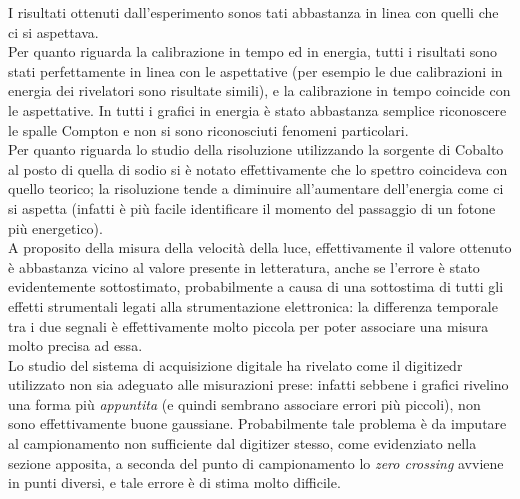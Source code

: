 I risultati ottenuti dall'esperimento sonos tati abbastanza in linea con quelli che ci si aspettava.\\

Per quanto riguarda la calibrazione in tempo ed in energia, tutti i risultati sono stati perfettamente in linea con le aspettative (per esempio le due calibrazioni in energia
dei rivelatori sono risultate simili), e la calibrazione in tempo coincide con le aspettative. In tutti i grafici in energia è stato abbastanza semplice riconoscere le spalle
Compton e non si sono riconosciuti fenomeni particolari.\\

Per quanto riguarda lo studio della risoluzione utilizzando la sorgente di Cobalto al posto di quella di sodio si è notato effettivamente che lo spettro coincideva con
quello teorico; la risoluzione tende a diminuire all'aumentare dell'energia come ci si aspetta (infatti è più facile identificare il momento del passaggio di un fotone
più energetico).\\

A proposito della misura della velocità della luce, effettivamente il valore ottenuto è abbastanza vicino al valore presente in letteratura, anche se l'errore è stato
evidentemente sottostimato, probabilmente a causa di una sottostima di tutti gli effetti strumentali legati alla strumentazione elettronica: la differenza temporale
tra i due segnali è effettivamente molto piccola per poter associare una misura molto precisa ad essa.\\

Lo studio del sistema di acquisizione digitale ha rivelato come il digitizedr utilizzato non sia adeguato alle misurazioni prese: infatti sebbene i grafici rivelino una
forma più \textit{appuntita} (e quindi sembrano associare errori più piccoli), non sono effettivamente buone gaussiane. Probabilmente tale problema è da imputare al
campionamento non sufficiente dal digitizer stesso, come evidenziato nella sezione apposita, a seconda del punto di campionamento lo \textit{zero crossing} avviene in
punti diversi, e tale errore è di stima molto difficile.

